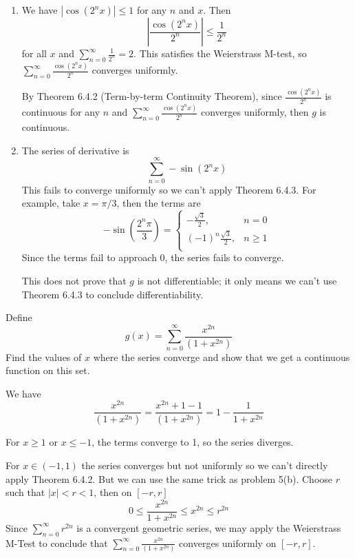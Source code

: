 \documentclass{oxmathproblems}
\begin{document}
\begin{questions}
\begin{solution}
  \begin{enumerate}[label=(\alph*)]
    \item We have $|\cos(2^{n}x)| \leq 1$ for any $n$ and $x$. Then
    \[\left|\frac{\cos(2^{n}x)}{2^n}\right| \leq \frac{1}{2^n}\]
    for all $x$ and $\sum_{n=0}^{\infty}\frac{1}{2^n} = 2$. This satisfies the Weierstrass M-test, so $\sum_{n=0}^{\infty}\frac{\cos(2^{n}x)}{2^n}$ converges uniformly.

    By Theorem 6.4.2 (Term-by-term Continuity Theorem), since $\frac{\cos(2^{n}x)}{2^n}$ is continuous for any $n$ and $\sum_{n=0}^{\infty}\frac{\cos(2^{n}x)}{2^n}$
    converges uniformly, then $g$ is continuous.

    \item The series of derivative is
    \[\sum_{n=0}^{\infty}-\sin(2^{n}x)\]
    This fails to converge uniformly so we can't apply Theorem 6.4.3. For example, take $x=\pi/3$, then the terms are
    \[
      -\sin\left(\frac{2^{n}\pi}{3}\right)=\begin{cases}
        -\frac{\sqrt{3}}{2}, & n=0\\
        (-1)^{n}\frac{\sqrt{3}}{2}, & n \geq 1\\
      \end{cases}
    \]
    Since the terms fail to approach 0, the series fails to converge.

    This does not prove that $g$ is not differentiable; it only means we can't use Theorem 6.4.3 to conclude differentiability.
  \end{enumerate}
\end{solution}

\miquestion Define
\[g(x)=\sum_{n=0}^{\infty}\frac{x^{2n}}{(1+x^{2n})}\]
Find the values of $x$ where the series converge and show that we get a continuous function on this set.

\begin{solution}
  We have
  \[\frac{x^{2n}}{(1+x^{2n})} = \frac{x^{2n}+1-1}{(1+x^{2n})}=1-\frac{1}{1+x^{2n}}\]

  For $x \geq 1$ or $x \leq -1$, the terms converge to 1, so the series diverges.

  For $x \in (-1, 1)$ the series converges but not uniformly so we can't directly apply Theorem 6.4.2. But we can use the same trick as problem 5(b).
  Choose $r$ such that $|x| < r < 1$, then on $[-r, r]$
  \[0 \leq \frac{x^{2n}}{1+x^{2n}} \leq x^{2n} \leq r^{2n}\]
  Since $\sum_{n=0}^{\infty}r^{2n}$ is a convergent geometric series, we may apply the Weierstrass M-Test to conclude that $\sum_{n=0}^{\infty}\frac{x^{2n}}{(1+x^{2n})}$
  converges uniformly on $[-r, r]$.


\end{solution}
\end{questions}
\end{document}
